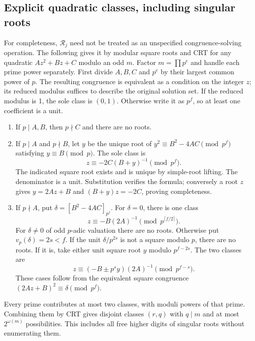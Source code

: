 \subsection{Explicit quadratic classes, including singular roots}
For completeness, $\mathcal R_j$ need not be treated as an unspecified
congruence-solving operation. The following gives it by modular square
roots and CRT for any quadratic $Az^2+Bz+C$ modulo an odd $m$.
Factor $m=\prod p^e$ and handle each prime power separately.
First divide $A,B,C$ and $p^e$ by their largest common power of $p$.
The resulting congruence is equivalent as a condition on the integer
$z$; its reduced modulus suffices to describe the original solution set.
If the reduced modulus is 1, the sole class is $(0,1)$.
Otherwise write it as $p^f$, so at least one coefficient is a unit.
\begin{enumerate}
\item If $p\mid A,B$, then $p\nmid C$ and there are no roots.
\item If $p\mid A$ and $p\nmid B$, let $y$ be the unique root of
$y^2\equiv B^2-4AC\pmod{p^f}$ satisfying $y\equiv B\pmod p$.
The sole class is
\[
 z\equiv-2C(B+y)^{-1}\pmod{p^f}.
\]
The indicated square root exists and is unique by simple-root lifting.
The denominator is a unit. Substitution verifies the formula;
conversely a root $z$ gives $y=2Az+B$ and
$(B+y)z=-2C$, proving completeness.
\item If $p\nmid A$, put $\delta=[B^2-4AC]_{p^f}$.
For $\delta=0$, there is one class
\[
 z\equiv-B(2A)^{-1}\pmod{p^{\lceil f/2\rceil}}.
\]
For $\delta\ne0$ of odd $p$-adic valuation there are no roots.
Otherwise put $v_p(\delta)=2s<f$. If the unit
$\delta/p^{2s}$ is not a square modulo $p$, there are no roots.
If it is, take either unit square root $y$ modulo $p^{f-2s}$.
The two classes are
\[
 z\equiv(-B\mathbin{\pm}p^s y)(2A)^{-1}\pmod{p^{f-s}}.
\]
These cases follow from the equivalent square congruence
$(2Az+B)^2\equiv\delta\pmod{p^f}$.
\end{enumerate}
Every prime contributes at most two classes, with moduli powers of that
prime. Combining them by CRT gives disjoint classes $(r,q)$ with $q\mid m$
and at most $2^{\omega(m)}$ possibilities. This includes all free higher
digits of singular roots without enumerating them.

